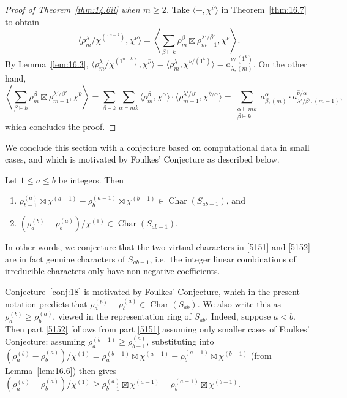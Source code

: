 \documentclass[ALCO, Unicode]{cedram}
\newcommand{\Ch}{\operatorname{Char}}
\begin{document}
\begin{proof}[Proof of Theorem~\ref{thm:14.6ii} when $m\ge 2$]
	Take $\langle -, \chi^{\hat{\nu}}\rangle$ in Theorem~\ref{thm:16.7} to obtain
	\[ \langle \rho^\lambda_m/\chi^{(1^{n-k})}, \chi^{\hat{\nu}} \rangle = \left\langle \sum_{\beta\vdash k} \rho^\beta_m\boxtimes \rho^{\lambda'/\beta'}_{m-1}, \chi^{\hat{\nu}} \right\rangle. \]
	By Lemma~\ref{lem:16.3}, $\langle \rho^\lambda_m/\chi^{(1^{n-k})}, \chi^{\hat{\nu}} \rangle = \langle \rho^\lambda_m, \chi^{\nu/(1^k)}\rangle = a^{\nu/(1^k)}_{\lambda,(m)}$. On the other hand,
	\[ \left\langle \sum_{\beta\vdash k} \rho^\beta_m\boxtimes \rho^{\lambda'/\beta'}_{m-1}, \chi^{\hat{\nu}} \right\rangle = \sum_{\beta\vdash k} \sum_{\alpha\vdash mk} \langle \rho^\beta_m,\chi^\alpha\rangle \cdot \langle \rho^{\lambda'/\beta'}_{m-1}, \chi^{\hat{\nu}/\alpha}\rangle = \sum_{\substack{\alpha\vdash mk\\\beta\vdash k}} a^\alpha_{\beta,(m)}\cdot a^{\hat{\nu}/\alpha}_{\lambda'/\beta',(m-1)}, \]
	which concludes the proof.
\end{proof}

We conclude this section with a conjecture based on computational data in small cases, and which is motivated by Foulkes' Conjecture as described below.
\begin{conjecture}\label{conj:18}
	Let $1\le a\le b$ be integers. Then
	\begin{enumerate}[label=\textup{(\roman*)}]
		\item \label{5151} $\rho^{(a)}_{b-1}\boxtimes \chi^{(a-1)} - \rho^{(a-1)}_b\boxtimes \chi^{(b-1)}\in \Ch(S_{ab-1})$, and
		\item \label{5152} $(\rho^{(b)}_a-\rho^{(a)}_b)/\chi^{(1)}\in \Ch(S_{ab-1})$.
	\end{enumerate}
\end{conjecture}
In other words, we conjecture that the two virtual characters in \ref{5151} and \ref{5152} are in fact genuine characters of $S_{ab-1}$, i.e.~the integer linear combinations of irreducible characters only have non-negative coefficients.

Conjecture~\ref{conj:18} is motivated by Foulkes' Conjecture, which in the present notation predicts that $\rho_a^{(b)}-\rho_b^{(a)}\in\Ch(S_{ab})$. We also write this as $\rho_a^{(b)}\ge\rho_b^{(a)}$, viewed in the representation ring of $S_{ab}$.  
Indeed, suppose $a<b$. 
Then part \ref{5152} follows from part \ref{5151} assuming only smaller cases of Foulkes' Conjecture: assuming $\rho^{(b-1)}_a\ge\rho^{(a)}_{b-1}$, substituting into $(\rho^{(b)}_a-\rho^{(a)}_b)/\chi^{(1)} = \rho^{(b-1)}_a\boxtimes\chi^{(a-1)} - \rho^{(a-1)}_b\boxtimes\chi^{(b-1)}$ (from Lemma~\ref{lem:16.6}) then gives $(\rho^{(b)}_a-\rho^{(a)}_b)/\chi^{(1)} \ge \rho^{(a)}_{b-1}\boxtimes\chi^{(a-1)} - \rho^{(a-1)}_b\boxtimes\chi^{(b-1)}$.
\end{document}
